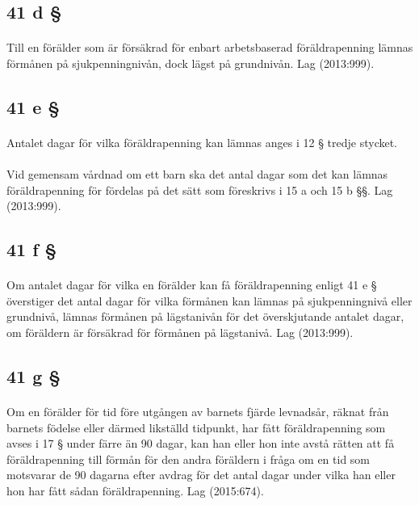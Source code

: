 \documentclass[a4paper,notitlepage,openany,10pt]{book}
\begin{document}
\subsection*{41 d §}
\paragraph*{}
Till en förälder som är försäkrad för enbart arbetsbaserad föräldrapenning lämnas förmånen på sjukpenningnivån, dock lägst på grundnivån.
Lag (2013:999).
\subsection*{41 e §}
\paragraph*{}
Antalet dagar för vilka föräldrapenning kan lämnas anges i 12 § tredje stycket.
\paragraph*{}
Vid gemensam vårdnad om ett barn ska det antal dagar som det kan lämnas föräldrapenning för fördelas på det sätt som föreskrivs i 15 a och 15 b §§.
Lag (2013:999).
\subsection*{41 f §}
\paragraph*{}
Om antalet dagar för vilka en förälder kan få föräldrapenning enligt 41 e § överstiger det antal dagar för vilka förmånen kan lämnas på sjukpenningnivå eller grundnivå, lämnas förmånen på lägstanivån för det överskjutande antalet dagar, om föräldern är försäkrad för förmånen på lägstanivå.
Lag (2013:999).
\subsection*{41 g §}
\paragraph*{}
Om en förälder för tid före utgången av barnets fjärde levnadsår, räknat från barnets födelse eller därmed likställd tidpunkt, har fått föräldrapenning som avses i 17 § under färre än 90 dagar, kan han eller hon inte avstå rätten att få föräldrapenning till förmån för den andra föräldern i fråga om en tid som motsvarar de 90 dagarna efter avdrag för det antal dagar under vilka han eller hon har fått sådan föräldrapenning.
Lag (2015:674).
\end{document}
